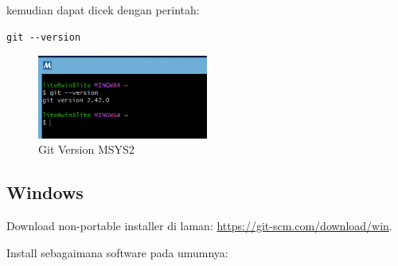 \documentclass[12pt]{book}
\begin{document}
	kemudian dapat dicek dengan perintah:
	
	\begin{verbatim}
git --version
	\end{verbatim}
	
	\begin{figure}[!ht]
		\centering
		\includegraphics[width=0.5\textwidth]{images/git/gitvermsys}
		\caption{Git Version MSYS2}
	\end{figure}
	
	\subsection{Windows}
	
	Download non-portable installer di laman: \url{https://git-scm.com/download/win}.
	
	Install sebagaimana software pada umumnya:
	
\end{document}
